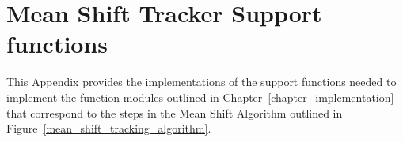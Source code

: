\appendix
\chapter{Mean Shift Tracker Support functions} \label{appendix_mean_shift_tracker}
This Appendix provides the implementations of the support functions needed to
implement the function modules outlined in Chapter~\ref{chapter_implementation}
that correspond to the steps in the Mean Shift Algorithm outlined in
Figure~\ref{mean_shift_tracking_algorithm}.

